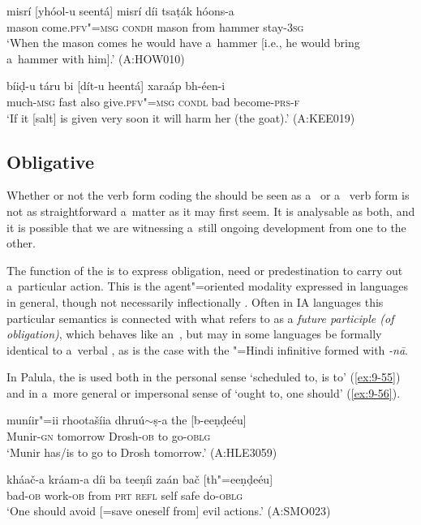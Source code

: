 \begin{exe}
\ex
\label{ex:9-53}
\gll misrí [yhóol-u seentá] misrí díi tsaṭák hóons-a \\
mason come.\textsc{pfv"=msg} \textsc{condh} mason from hammer stay-\textsc{3sg} \\
\glt `When the mason comes he would have a~hammer [i.e., he would bring a~hammer with him].' (A:HOW010)

\ex
\label{ex:9-54}
\gll bíiḍ-u táru bi [dít-u heentá] xaraáp bh-éen-i \\
much-\textsc{msg} fast also give.\textsc{pfv"=msg} \textsc{condl} bad become-\textsc{prs-f} \\
\glt `If it [salt] is given very soon it will harm her (the goat).' (A:KEE019)
\end{exe}

\subsection{Obligative}
\label{subsec:9-2-3}

Whether or not the verb form coding the  should be seen as a~ or a~ verb form is not as straightforward a~matter as it may first seem. It is analysable as both, and it is possible that we are witnessing a~still ongoing development from one to the other. 



The function of the  is to express obligation, need or predestination to carry out a~particular action. This is the agent"=oriented modality expressed in languages in general, though not necessarily inflectionally \citep[177--187]{bybeeetal1994}. Often in IA languages this particular semantics is connected with what \citet[322]{masica1991} refers to as a \textit{future  participle (of obligation)}, which behaves like an~, but may in some languages be formally identical to a~verbal , as is the case with the "=Hindi infinitive formed with \textit{-nā}. 



In Palula, the  is used both in the personal sense `scheduled to, is to' (\ref{ex:9-55}) and in a~more general or impersonal sense of `ought to, one should' (\ref{ex:9-56}).

\begin{exe}
\ex
\label{ex:9-55}
\gll muníir"=ii rhootašíia dhruú$\sim$ṣ-a the [b-eeṇḍeéu] \\
Munir-\textsc{gn } tomorrow Drosh-\textsc{ob} to go-\textsc{oblg} \\
\glt `Munir has/is to go to Drosh tomorrow.' (A:HLE3059)

\ex
\label{ex:9-56}
\gll kháač-a kráam-a díi ba teeṇíi zaán bač [th"=eeṇḍeéu] \\
bad-\textsc{ob} work-\textsc{ob} from \textsc{prt} \textsc{refl} self safe do-\textsc{oblg} \\
\glt `One should avoid [=save oneself from] evil actions.' (A:SMO023)
\end{exe}

